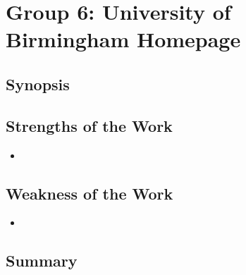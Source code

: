 \section{Group 6: University of Birmingham Homepage}

\subsection{Synopsis}

\subsection{Strengths of the Work}

\begin{itemize}
	\item
\end{itemize}

\subsection{Weakness of the Work}

\begin{itemize}
	\item
\end{itemize}

\subsection{Summary}

